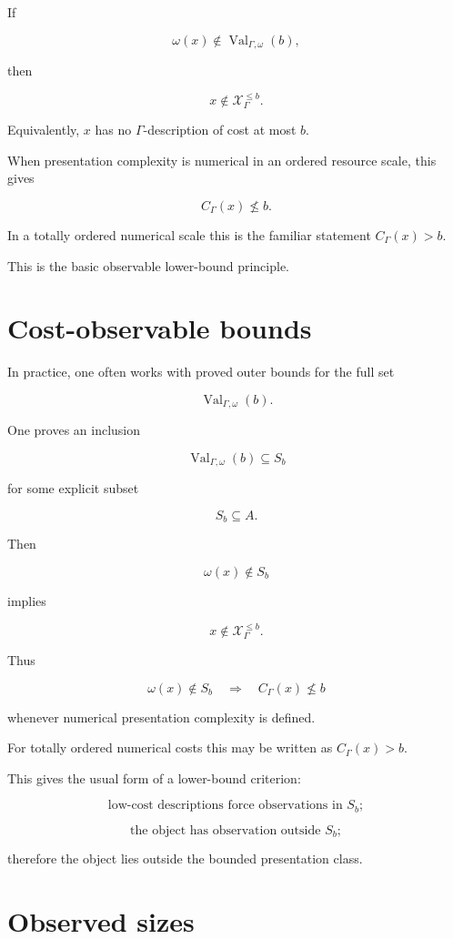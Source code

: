 \documentclass[11pt]{article}
\begin{document}
If

\[
\omega(x)\notin \operatorname{Val}_{\Gamma,\omega}(b),
\]

then

\[
x\notin \mathcal X_\Gamma^{\leq b}.
\]

Equivalently, \(x\) has no \(\Gamma\)-description of cost at most \(b\).

When presentation complexity is numerical in an ordered resource scale, this gives

\[
C_\Gamma(x)\nleq b.
\]

In a totally ordered numerical scale this is the familiar statement \(C_\Gamma(x)>b\).

This is the basic observable lower-bound principle.


\section{Cost-observable bounds}

In practice, one often works with proved outer bounds for the full set

\[
\operatorname{Val}_{\Gamma,\omega}(b).
\]

One proves an inclusion

\[
\operatorname{Val}_{\Gamma,\omega}(b)\subseteq S_b
\]

for some explicit subset

\[
S_b\subseteq A.
\]

Then

\[
\omega(x)\notin S_b
\]

implies

\[
x\notin \mathcal X_\Gamma^{\leq b}.
\]

Thus

\[
\omega(x)\notin S_b
\quad\Longrightarrow\quad
C_\Gamma(x)\nleq b
\]

whenever numerical presentation complexity is defined.

For totally ordered numerical costs this may be written as \(C_\Gamma(x)>b\).

This gives the usual form of a lower-bound criterion:

\[
\text{low-cost descriptions force observations in }S_b;
\]

\[
\text{the object has observation outside }S_b;
\]

therefore the object lies outside the bounded presentation class.


\section{Observed sizes}
\end{document}
